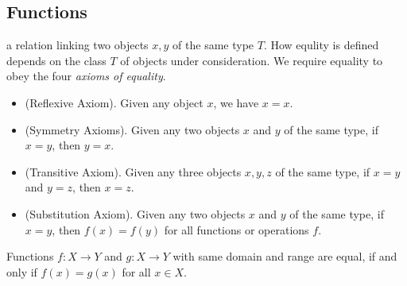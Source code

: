 \subsection{Functions}
\begin{defi}
    a relation linking two objects $x,y$ of the same type $T$. How equlity is
    defined depends on the class $T$ of objects under consideration. We require
    equality to obey the four \emph{axioms of equality}.
    \begin{itemize}
        \item (Reflexive Axiom). Given any object $x$, we have $x=x$.
        \item (Symmetry Axioms). Given any two objects $x$ and $y$ of the same
        type, if $x=y$, then $y=x$.
        \item (Transitive Axiom). Given any three objects $x,y,z$ of the same
        type, if $x=y$ and $y=z$, then $x=z$.
        \item (Substitution Axiom). Given any two objects $x$ and $y$ of the
        same type, if $x=y$, then $f(x)=f(y)$ for all functions or operations
        $f$.
    \end{itemize}
\end{defi}
\begin{defi} Functions $f:X\to Y$ and $g:X\to Y$ with
same domain and range are equal, if and only if $f(x)=g(x)$ for all $x\in X$.
     
\end{defi}
